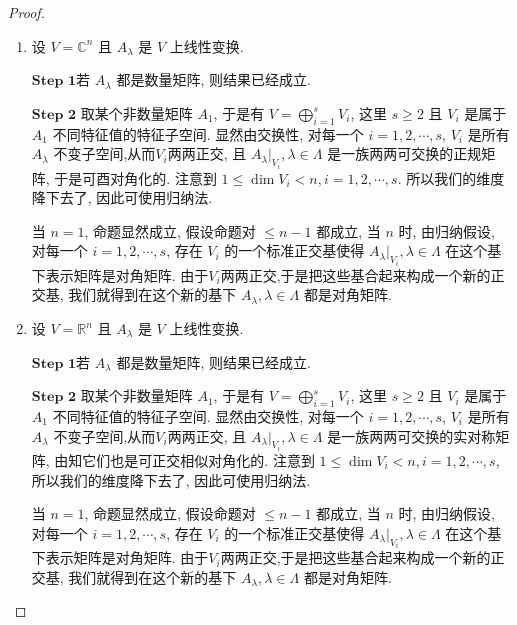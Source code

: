 \documentclass[../../main.tex]{subfiles}
\begin{document}
\begin{proof}
\begin{enumerate}
\item 设 \(V = \mathbb{C}^n\) 且 \(A_{\lambda}\) 是 \(V\) 上线性变换.

$\mathbf{Step}\,\,\mathbf{1}$若 \(A_{\lambda}\) 都是数量矩阵, 则结果已经成立.

$\mathbf{Step}\,\,\mathbf{2}$ 取某个非数量矩阵 \(A_1\), 于是有 \(V = \bigoplus_{i=1}^s V_i\), 这里 \(s \geqslant 2\) 且 \(V_i\) 是属于 \(A_1\) 不同特征值的特征子空间. 显然由交换性, 对每一个 \(i = 1, 2, \cdots, s\), \(V_i\) 是所有 \(A_{\lambda}\) 不变子空间,从而$V_i$两两正交, 且 \(A_{\lambda}|_{V_i}, \lambda \in \Lambda\) 是一族两两可交换的正规矩阵, 于是可酉对角化的. 注意到 \(1 \leqslant \dim V_i < n, i = 1, 2, \cdots, s\). 所以我们的维度降下去了, 因此可使用归纳法.

当 \(n = 1\), 命题显然成立, 假设命题对 \(\leqslant n - 1\) 都成立, 当 \(n\) 时, 由归纳假设, 对每一个 \(i = 1, 2, \cdots, s\), 存在 \(V_i\) 的一个标准正交基使得 \(A_{\lambda}|_{V_i}, \lambda \in \Lambda\) 在这个基下表示矩阵是对角矩阵. 由于$V_i$两两正交,于是把这些基合起来构成一个新的正交基, 我们就得到在这个新的基下 \(A_{\lambda}, \lambda \in \Lambda\) 都是对角矩阵.

\item 设 \(V = \mathbb{R}^n\) 且 \(A_{\lambda}\) 是 \(V\) 上线性变换.

$\mathbf{Step}\,\,\mathbf{1}$若 \(A_{\lambda}\) 都是数量矩阵, 则结果已经成立.

$\mathbf{Step}\,\,\mathbf{2}$ 取某个非数量矩阵 \(A_1\), 于是有 \(V = \bigoplus_{i=1}^s V_i\), 这里 \(s \geqslant 2\) 且 \(V_i\) 是属于 \(A_1\) 不同特征值的特征子空间. 显然由交换性, 对每一个 \(i = 1, 2, \cdots, s\), \(V_i\) 是所有 \(A_{\lambda}\) 不变子空间,从而$V_i$两两正交, 且 \(A_{\lambda}|_{V_i}, \lambda \in \Lambda\) 是一族两两可交换的实对称矩阵, 由知它们也是可正交相似对角化的. 注意到 \(1 \leqslant \dim V_i < n, i = 1, 2, \cdots, s\), 所以我们的维度降下去了, 因此可使用归纳法.

当 \(n = 1\), 命题显然成立, 假设命题对 \(\leqslant n - 1\) 都成立, 当 \(n\) 时, 由归纳假设, 对每一个 \(i = 1, 2, \cdots, s\), 存在 \(V_i\) 的一个标准正交基使得 \(A_{\lambda}|_{V_i}, \lambda \in \Lambda\) 在这个基下表示矩阵是对角矩阵. 由于$V_i$两两正交,于是把这些基合起来构成一个新的正交基, 我们就得到在这个新的基下 \(A_{\lambda}, \lambda \in \Lambda\) 都是对角矩阵.
\end{enumerate}
\end{proof}
\end{document}
